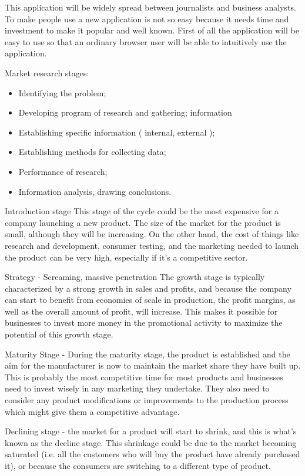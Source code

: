 This application will be widely spread between journalists and business analysts. To make people use a new application is not so easy because it needs time and investment to make it popular and well known. First of all the application will be easy to use so that an ordinary browser user will be able to intuitively use the application.

\clearpage
Market research stages:
\begin{itemize}
 \item Identifying the problem;
 \item Developing program of research and gathering;
information
 \item Establishing specific information ( internal, external );
 \item Establishing methods for collecting data;
 \item Performance of research;
 \item Information analysis, drawing conclusions.
\end{itemize}

Introduction stage This stage of the cycle could be the most expensive for a company launching a new product. The size of the market for the product is small, although they will be increasing. On the other hand, the cost of things like research and development, consumer testing, and the marketing needed to launch the product can be very high, especially if it's a competitive sector.

Strategy - Screaming, massive penetration The growth stage is typically characterized by a strong growth in sales and profits, and because the company can start to benefit from economies of scale in production, the profit margins, as well as the overall amount of profit, will increase. This makes it possible for businesses to invest more money in the promotional activity to maximize the potential of this growth stage.

Maturity Stage - During the maturity stage, the product is established and the aim for the manufacturer is now to maintain the market share they have built up. This is probably the most competitive time for most products and businesses need to invest wisely in any marketing they undertake. They also need to consider any product modifications or improvements to the production process which might give them a competitive advantage.

Declining stage - the market for a product will start to shrink, and this is what's known as the decline stage. This shrinkage could be due to the market becoming saturated (i.e. all the customers who will buy the product have already purchased it), or because the consumers are switching to a different type of product.


